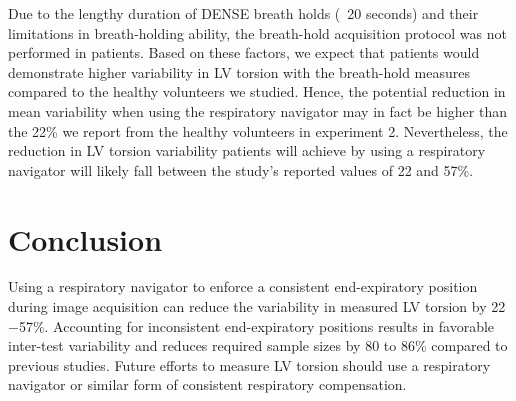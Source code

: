 	Due to the lengthy duration of DENSE breath holds (~20 seconds) and their limitations in breath-holding ability, the breath-hold acquisition protocol was not performed in patients. Based on these factors, we expect that patients would demonstrate higher variability in LV torsion with the breath-hold measures compared to the healthy volunteers we studied. Hence, the potential reduction in mean variability when using the respiratory navigator may in fact be higher than the 22\% we report from the healthy volunteers in experiment 2. Nevertheless, the reduction in LV torsion variability patients will achieve by using a respiratory navigator will likely fall between the study's reported values of 22 and 57\%.

\section{Conclusion}
	Using a respiratory navigator to enforce a consistent end-expiratory position during image acquisition can reduce the variability in measured LV torsion by 22$-$57\%. Accounting for inconsistent end-expiratory positions results in favorable inter-test variability and reduces required sample sizes by 80 to 86\% compared to previous studies. Future efforts to measure LV torsion should use a respiratory navigator or similar form of consistent respiratory compensation.





